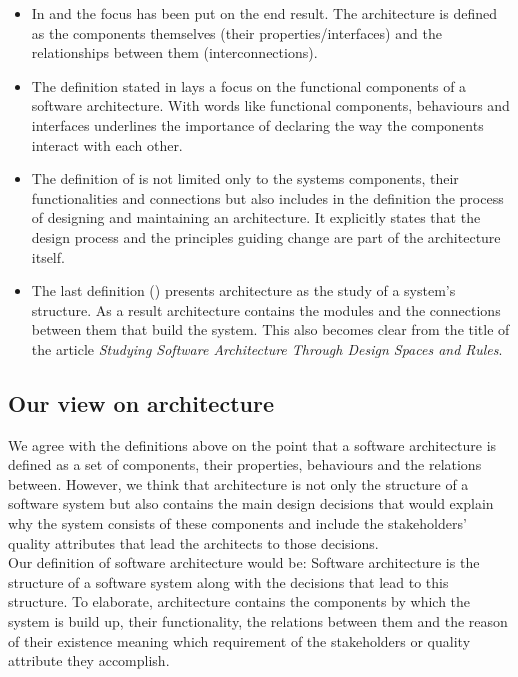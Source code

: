 \documentclass{article}
\begin{document}
\begin{itemize}
\item In \cite{clemens} and \cite{hayesroth} the focus has been put on the end result. The architecture 
is defined as the components themselves (their properties/interfaces) and the relationships between them (interconnections).
\item The definition stated in \cite{hayesroth} lays a focus on the functional components of a software architecture. With words like functional components, 
behaviours and interfaces underlines the importance of declaring the way the components interact with each other.
\item The definition of \cite{IEEE1471} is not limited only to the systems components, their functionalities and connections but also includes in the definition the 
process of designing and maintaining an architecture. It explicitly states that the design process and the principles guiding change are part of the architecture itself.
\item The last definition (\cite{lane90}) presents architecture as the study of a system's structure. As a result architecture contains the modules and the connections between them that build the system. This also becomes clear
from the title of the article \emph{Studying Software Architecture Through Design Spaces and Rules}.
\end{itemize}

\subsection{Our view on architecture}
We agree with the definitions above on the point that a software architecture is defined as a set of components, their properties, behaviours and the relations between. However, we think that architecture is not only the structure of a software system but also contains the main design decisions that would explain why the system consists of 
these components and include the stakeholders' quality attributes that lead the architects to those decisions. \\ 

Our definition of software architecture would be:
Software architecture is the structure of a software system along with the decisions that lead to this structure. To elaborate, architecture contains the components by which
the system is build up, their functionality, the relations between them and the reason of their existence meaning which requirement of the stakeholders or quality attribute they accomplish. 
\end{document}
